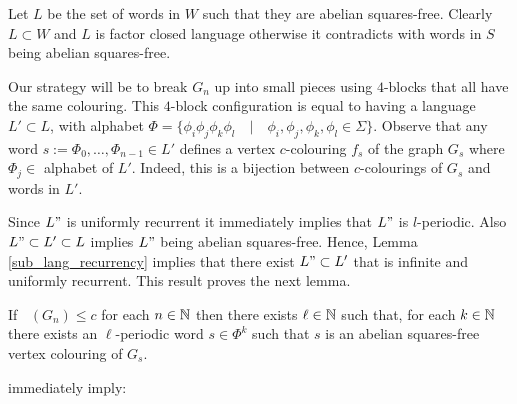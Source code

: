 \documentclass{patmorin}
\DeclareMathOperator{\afcn}{\dot{\chi}_\pi}
\begin{document}



    Let $L$ be the set of words in $W$ such that they are abelian squares-free. Clearly $L \subset W$ and $L$ is factor closed language otherwise it contradicts with words in $S$ being abelian squares-free. 
    
    Our strategy will be to break $G_n$ up into small pieces using $4$-blocks that all have the same colouring.
This $4$-block configuration is equal to having a language $L' \subset L$, with alphabet $\Phi  = \{\phi_i\phi_j\phi_k\phi_l\quad|\quad \phi_i,\phi_j,\phi_k,\phi_l \in \Sigma\}$.
    Observe that any word $s:=\Phi_0,\ldots,\Phi_{n-1}\in L'$ defines a vertex $c$-colouring $f_s$ of the graph $G_{s}$ where $\Phi_j \in$ alphabet of $L'$.  Indeed, this is a bijection between $c$-colourings of $G_{s}$ and words in $L'$.
    
    
    Since $L"$ is uniformly recurrent it immediately implies that $L"$ is $l$-periodic. Also $L" \subset L' \subset L$ implies $L"$ being abelian squares-free. Hence, Lemma \ref{sub_lang_recurrency} implies that there exist $L" \subset L'$ that is infinite and uniformly recurrent. This result proves the next lemma.
    

\begin{lem}\label{block_colouring}
    If $\afcn(G_n)\le c$ for each $n\in\mathbb{N}$ then there exists $\ell\in\mathbb{N}$ such that, for each $k\in\mathbb{N}$ there exists an $\ell$-periodic word $s\in\Phi^{k}$ such that $s$ is an abelian squares-free vertex colouring of $G_{s}$.
\end{lem}


 immediately imply:
\end{document}
